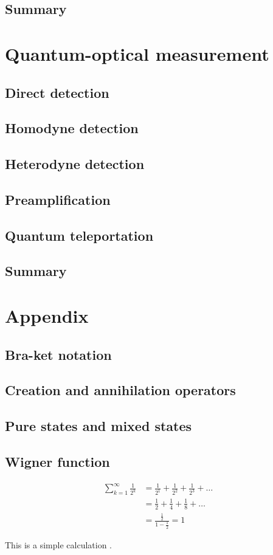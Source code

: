 \documentclass{book}
\begin{document}
\section{Summary}

\chapter{Quantum-optical measurement}
\section{Direct detection}
\section{Homodyne detection}
\section{Heterodyne detection}
\section{Preamplification}
\section{Quantum teleportation}
\section{Summary}

\appendix
\chapter{Appendix}
\section{Bra-ket notation}
\section{Creation and annihilation operators}
\section{Pure states and mixed states}
\section{Wigner function}

\begin{equation}
\begin{aligned}
  \sum_{k=1}^\infty \frac 1 {2^k} &= \frac 1 {2^1} + \frac 1 {2^2} + \frac 1 {2^3} + \dots \\
  &= \frac{1}{2} + \frac{1}{4} + \frac{1}{8} + \dots \\
  &= \frac{\frac 1 2}{1-\frac 1 2} =  1
\end{aligned}
\end{equation}

This is a simple calculation \cite{adams1995hitchhiker}.

\printindex



\end{document}
